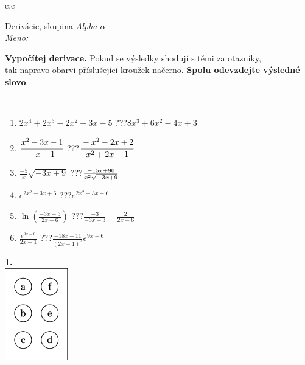 \documentclass[10pt]{report}
\begin{document}
\thispagestyle{empty}
\begin{tabular}{c:c}
\begin{minipage}[c][104.5mm][t]{0.5\linewidth}
\begin{center}
\vspace{7mm}
{\huge Derivácie, skupina \textit{Alpha $\alpha$} -}\\[5mm]
\textit{Meno:}\phantom{xxxxxxxxxxxxxxxxxxxxxxxxxxxxxxxxxxxxxxxxxxxxxxxxxxxxxxxxxxxxxxxxx}\\[5mm]
\begin{minipage}{0.95\linewidth}
\begin{center}
\textbf{Vypočítej derivace.} Pokud se výsledky shodují s těmi za otazníky,\\tak napravo obarvi příslušející kroužek načerno. \textbf{Spolu odevzdejte výsledné slovo}.
\end{center}
\end{minipage}
\\[1mm]
\begin{minipage}{0.79\linewidth}
\begin{center}
\begin{varwidth}{\linewidth}
\begin{enumerate}
\normalsize
\item $2x^4+2x^3-2x^2+3x-5$\quad \dotfill\; ???\;\dotfill \quad $8x^3+6x^2-4x+3$
\item $\cfrac{x^2-3x-1}{-x-1}$\quad \dotfill\; ???\;\dotfill \quad $\cfrac{-x^2-2x+2}{x^2+2x+1}$
\item $\frac{-5}{x}\sqrt{-3x+9}$\quad \dotfill\; ???\;\dotfill \quad $\frac{-15x+90}{x^2 \sqrt{\smash[b]{-3x+9}}}$
\item $e^{2x^2-3x+6}$\quad \dotfill\; ???\;\dotfill \quad $e^{2x^2-3x+6}$
\item $\ln{\left(\frac{-3x-3}{2x-6}\right)}$\quad \dotfill\; ???\;\dotfill \quad $\frac{-3}{-3x-3}-\frac{2}{2x-6}$
\item $\frac{e^{9x-6}}{2x-1}$\quad \dotfill\; ???\;\dotfill \quad $\frac{-18x-11}{(2x-1)^2}e^{9x-6}$
\end{enumerate}
\end{varwidth}
\end{center}
\end{minipage}
\begin{minipage}{0.20\linewidth}
\begin{center}
{\Huge\bfseries 1.} \\[2mm]
\includegraphics[height=40mm]{../images/braille.png}

\end{center}
\end{minipage}
\end{center}
\end{minipage}
\end{tabular}
\end{document}
